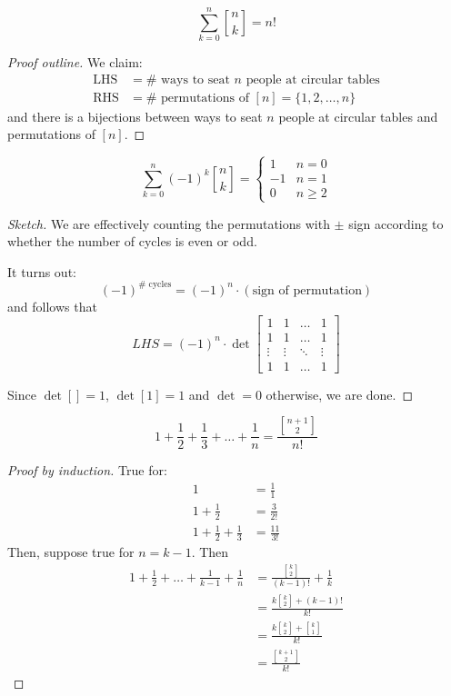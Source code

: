 \documentclass[12pt]{article}
\begin{document}
\begin{theorem}
    \[\sum_{k=0}^{n}{n\brack k}=n!\]
\end{theorem}
\begin{proof}[Proof outline]
    We claim: \begin{align*}
        \text{LHS} &= \#\text{ ways to seat $n$ people at circular tables}\\
        \text{RHS} &= \#\text{ permutations of }[n]=\{1,2,\dots,n\}
    \end{align*}
    and there is a bijections between ways to seat $n$ people at circular tables and permutations of $[n]$. 
\end{proof}

\begin{theorem}
    \[\sum_{k=0}^{n}(-1)^k{n\brack k} = \begin{cases}
        1 & n=0\\
        -1 & n=1\\
        0 & n\geq 2
    \end{cases}\]
\end{theorem}
\begin{proof}[Sketch]
    We are effectively counting the permutations with $\pm$ sign according to whether the number of cycles is even or odd.

    It turns out: \[(-1)^{\#\text{ cycles}} = (-1)^{n}\cdot (\text{sign of permutation})\] and follows that \[LHS = (-1)^{n}\cdot \det \begin{bmatrix}
        1&1&\dots&1\\
        1&1&\dots&1\\
        \vdots&\vdots&\ddots &\vdots\\
        1&1&\dots&1
    \end{bmatrix}\]

    Since $\det[]=1$, $\det[1]=1$ and $\det=0$ otherwise, we are done.
\end{proof}

\begin{theorem}
    \[1+\frac{1}{2}+\frac{1}{3}+\dots+\frac{1}{n} = \frac{{n+1\brack 2}}{n!}\]
\end{theorem}
\begin{proof}[Proof by induction]
    True for: \begin{align*}
        1 &= \frac{1}{1}\\
        1+\frac{1}{2} &= \frac{3}{2!}\\
        1+\frac{1}{2} + \frac{1}{3} &= \frac{11}{3!}
    \end{align*}
    Then, suppose true for $n=k-1$. Then \begin{align*}
        1+\frac{1}{2}+\dots+\frac{1}{k-1}+\frac{1}{n}&=\frac{{k\brack 2}}{(k-1)!}+\frac{1}{k}\\
        &= \frac{k{k\brack 2}+(k-1)!}{k!}\\
        &= \frac{k{k\brack 2}+{k\brack 1}}{k!}\\
        &= \frac{{k+1\brack 2}}{k!}
    \end{align*}
\end{proof}
\end{document}
